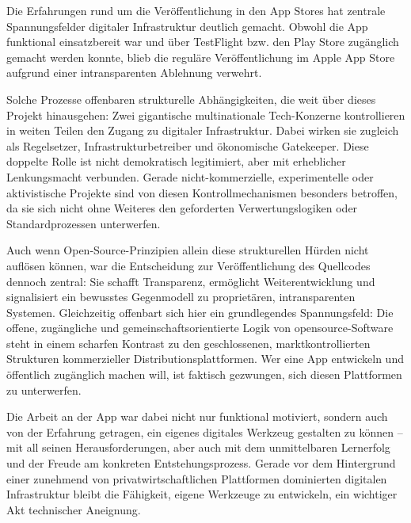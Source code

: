 Die Erfahrungen rund um die Veröffentlichung in den App Stores hat zentrale Spannungsfelder digitaler Infrastruktur deutlich gemacht. Obwohl die App funktional einsatzbereit war und über TestFlight bzw. den Play Store zugänglich gemacht werden konnte, blieb die reguläre Veröffentlichung im Apple App Store aufgrund einer intransparenten Ablehnung verwehrt.

Solche Prozesse offenbaren strukturelle Abhängigkeiten, die weit über dieses Projekt hinausgehen: Zwei gigantische multinationale Tech-Konzerne kontrollieren in weiten Teilen den Zugang zu digitaler Infrastruktur. Dabei wirken sie zugleich als Regelsetzer, Infrastrukturbetreiber und ökonomische Gatekeeper. Diese doppelte Rolle ist nicht demokratisch legitimiert, aber mit erheblicher Lenkungsmacht verbunden. Gerade nicht-kommerzielle, experimentelle oder aktivistische Projekte sind von diesen Kontrollmechanismen besonders betroffen, da sie sich nicht ohne Weiteres den geforderten Verwertungslogiken oder Standardprozessen unterwerfen.

Auch wenn Open-Source-Prinzipien allein diese strukturellen Hürden nicht auflösen können, war die Entscheidung zur Veröffentlichung des Quellcodes dennoch zentral: Sie schafft Transparenz, ermöglicht Weiterentwicklung und signalisiert ein bewusstes Gegenmodell zu proprietären, intransparenten Systemen. Gleichzeitig offenbart sich hier ein grundlegendes Spannungsfeld: Die offene, zugängliche und gemeinschaftsorientierte Logik von \gls{opensource}-Software steht in einem scharfen Kontrast zu den geschlossenen, marktkontrollierten Strukturen kommerzieller Distributionsplattformen. Wer eine App entwickeln und öffentlich zugänglich machen will, ist faktisch gezwungen, sich diesen Plattformen zu unterwerfen.

Die Arbeit an der App war dabei nicht nur funktional motiviert, sondern auch von der Erfahrung getragen, ein eigenes digitales Werkzeug gestalten zu können – mit all seinen Herausforderungen, aber auch mit dem unmittelbaren Lernerfolg und der Freude am konkreten Entstehungsprozess. Gerade vor dem Hintergrund einer zunehmend von privatwirtschaftlichen Plattformen dominierten digitalen Infrastruktur bleibt die Fähigkeit, eigene Werkzeuge zu entwickeln, ein wichtiger Akt technischer Aneignung.